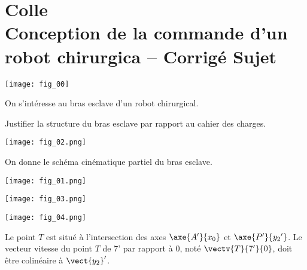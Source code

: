 \chapter*{Colle  \\ 
Conception de la commande d’un robot chirurgica -- 
\ifprof Corrigé \else Sujet \fi}

\iflivret {} \else
\ifprof  {} \else \fi
\fi

\setcounter{question}{0}

\begin{marginfigure}[4cm]
\centering
\texttt{[image: fig\_00]}
\end{marginfigure}







On s'intéresse au bras esclave d'un robot chirurgical. 
\begin{obj}
Justifier la structure du bras esclave par rapport au cahier des charges.
\end{obj}

\begin{center}
\texttt{[image: fig\_02.png]}
\end{center}

On donne le schéma cinématique partiel du bras esclave.

\begin{center}
\texttt{[image: fig\_01.png]}
\end{center}

\begin{center}
\texttt{[image: fig\_03.png]}
\end{center}


\begin{center}
\texttt{[image: fig\_04.png]}
\end{center}

Le point $T$ est situé à l’intersection des axes $\axe{A'}{{x_0}}$ et  $\axe{P'}{{y_2}'}$. 
Le vecteur vitesse du point $T$ de 7’ par rapport à 0, noté $\vectv{T}{7'}{0}$, doit être colinéaire à 
$\vect{y_2}'$.



